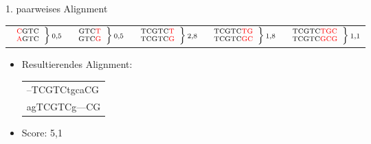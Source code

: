 \documentclass[wide,xcolor={x11names},hyperref={colorlinks=false},pantone312]{beamer}
\begin{document}
\begin{frame}[t]{1. paarweises Alignment}
\begin{tabular*}{12cm}{lllll}
		\rule{0pt}{4ex}
		$ \scriptsize \left. \begin{array}{c} \mbox{\textcolor{red}{C}GTC} \\ \mbox{\textcolor{red}{A}GTC} \end{array} \right \} \mbox{0,5}$ & $ \scriptsize \left. \begin{array}{c} \mbox{GTC\textcolor{red}{T}} \\ \mbox{GTC\textcolor{red}{G}} \end{array} \right \} \mbox{0,5}$ & $ \scriptsize \left. \begin{array}{c} \mbox{TCGTC\textcolor{red}{T}} \\ \mbox{TCGTC\textcolor{red}{G}} \end{array} \right \} \mbox{2,8}$ & $ \scriptsize \left. \begin{array}{c} \mbox{TCGTC\textcolor{red}{TG}} \\ \mbox{TCGTC\textcolor{red}{GC}} \end{array} \right \} \mbox{1,8}$ & $ \scriptsize \left. \begin{array}{c} \mbox{TCGTC\textcolor{red}{TGC}} \\ \mbox{TCGTC\textcolor{red}{GCG}} \end{array} \right \} \mbox{1,1}$ 
	\end{tabular*} \pause
	\begin{itemize}
		\item Resultierendes Alignment: \\
		\ttfamily
		\begin{tabular}{l}
			--TCGTCtgcaCG \\
			agTCGTCg---CG
		\end{tabular}	
		\item Score: 5,1	
	\end{itemize}
	\normalfont
	\normalsize

\end{frame}
\end{document}

